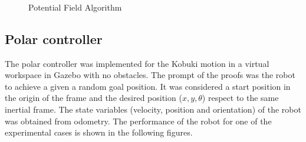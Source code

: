 \documentclass[conference]{IEEEtran}
\begin{document}
\begin{figure}[ht!]
	\centering
	\\
	\\
	\\
	\caption{Potential Field Algorithm} \label{f:apf}
\end{figure}

\subsection{Polar controller}

The polar controller was implemented for the Kobuki motion in a virtual workspace in Gazebo with no obstacles. The prompt of the proofs was the robot to achieve a given a random goal position.  It was considered a start position in the origin of the frame and the desired position ($x,y,\theta$) respect to the same inertial frame. The state variables (velocity, position and orientation) of the robot was obtained from odometry. The performance of the robot for one of the experimental cases is shown in the following figures.
\end{document}

